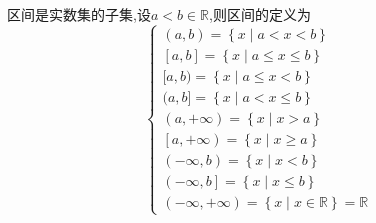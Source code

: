 \begin{formal}
\begin{definition}[区间的定义]\label{def:区间的定义}
    区间是实数集的子集,设$a<b\in \mathbb{R}$,则区间的定义为\[
    \begin{cases*}
           (a,b)=\left\{
                x\mid a<x<b
            \right\}\\
            [a,b]=\left\{
                x\mid a\leq x\leq b
            \right\}\\
            [a,b)=\left\{
                x\mid a\leq x<b
            \right\}\\
            (a,b]=\left\{
                x\mid a<x\leq b
            \right\}\\
            \left(
                a,+ \infty
            \right)  =\left\{
                x\mid x>a
            \right\}\\
            \left[
                a,+ \infty
            \right) =\left\{
                x\mid x\geqslant a
            \right\}\\
            \left(
                -\infty,b
            \right) =\left\{
                x\mid x<b
            \right\}\\
            \left(
                -\infty,b
            \right] =\left\{
                x\mid x\leqslant b
            \right\}\\
            \left(
                -\infty,+ \infty
            \right) =\left\{
                x\mid x\in \mathbb{R}
            \right\}=\mathbb{R}
    \end{cases*}
    \]
\end{definition}
\end{formal}
